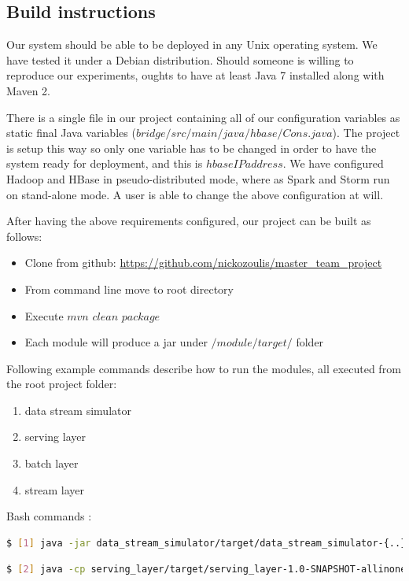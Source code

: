 \documentclass{lmproj}
\begin{document}
\subsection{Build instructions}

Our system should be able to be deployed in any Unix operating system. We have tested it under a Debian distribution. Should someone is willing to reproduce our experiments, oughts to have at least Java 7 installed along with Maven 2. 

There is a single file in our project containing all of our configuration variables as static final Java variables ($bridge/src/main/java/hbase/Cons.java$). The project is setup this way so only one variable has to be changed in order to have the system ready for deployment, and this is $hbaseIPaddress$. We have configured Hadoop and HBase in pseudo-distributed mode, where as Spark and Storm run on stand-alone mode. A user is able to change the above configuration at will. 

After having the above requirements configured, our project can be built as follows:

\begin{itemize}
	\item Clone from github:   \url{https://github.com/nickozoulis/master_team_project} 
	\item From command line move to root directory
	\item Execute $mvn$ $clean$ $package$ 
	\item Each module will produce a jar under $/module/target/$ folder
\end{itemize}

Following example commands describe how to run the modules, all executed from the root project folder:

\begin{enumerate}
	\item data stream simulator
	\item serving layer
	\item batch layer
	\item stream layer
\end{enumerate}

\noindent Bash commands :
\begin{lstlisting}[language=bash]
$ [1] java -jar data_stream_simulator/target/data_stream_simulator-{..}-jar-with-dependencies.jar -f {filepath to normalized dataset}
\end{lstlisting}

\begin{lstlisting}[language=bash]
$ [2] java -cp serving_layer/target/serving_layer-1.0-SNAPSHOT-allinone.jar {option -f with a given queries file}
\end{lstlisting}
\end{document}
